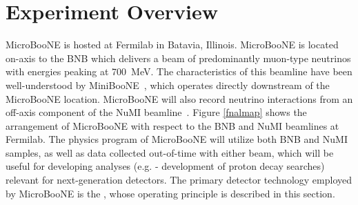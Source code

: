 \section{Experiment Overview}
\label{sec:overview}

MicroBooNE is hosted at Fermilab in Batavia, Illinois. MicroBooNE is located on-axis to the BNB which delivers a beam of predominantly muon-type neutrinos with energies peaking at 700~MeV. The characteristics of this beamline have been well-understood by MiniBooNE~\cite{AguilarArevalo:2008-MBflux}, which operates directly downstream of the MicroBooNE location. MicroBooNE will also record neutrino interactions from an off-axis component of the NuMI beamline~\cite{NuMIbeam}.  Figure \ref{fnalmap} shows the arrangement of MicroBooNE with respect to the BNB and NuMI beamlines at Fermilab.  The physics program of MicroBooNE will utilize both BNB and NuMI samples, as well as data collected out-of-time with either beam, which will be useful for developing analyses (e.g. - development of proton decay searches) relevant for next-generation detectors.  The primary detector technology employed by MicroBooNE is the \lartpc, whose operating principle is described in this section.

